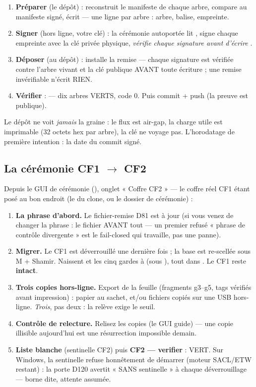 \begin{enumerate}
\item \textbf{Préparer} (le dépôt) :  reconstruit le
manifeste de chaque arbre, compare au manifeste signé, écrit  —
une ligne par arbre : arbre, balise, empreinte.
\item \textbf{Signer} (hors ligne, votre clé) : la cérémonie autoportée
 lit , signe chaque
empreinte avec la clé privée physique, \emph{vérifie chaque signature avant
d'écrire} .
\item \textbf{Déposer} (au dépôt) :  installe la remise —
chaque signature est vérifiée contre l'arbre vivant et la clé publique AVANT toute
écriture ; une remise invérifiable n'écrit RIEN.
\item \textbf{Vérifier} :  — dix arbres VERTS, code 0.
Puis commit + push (la preuve est publique).
\end{enumerate}

Le dépôt ne voit \emph{jamais} la graine : le flux est air-gap, la charge utile est
imprimable (32 octets hex par arbre), la clé ne voyage pas. L'horodatage de première
intention : la date du commit signé.

\subsection{La cérémonie CF1 $\to$ CF2}\label{sec:cercf2}

Depuis le GUI de cérémonie (), onglet « Coffre CF2 » — le
coffre réel CF1 étant posé au bon endroit (le  du clone, ou
le dossier de cérémonie) :

\begin{enumerate}
\item \textbf{La phrase d'abord.} Le fichier-remise D81 est à jour (si vous venez de
changer la phrase : le fichier AVANT tout — un premier  refusé « phrase
de contrôle divergente » est le fail-closed qui travaille, pas une panne).
\item \textbf{Migrer.} Le CF1 est déverrouillé une dernière fois ; la base est
re-scellée sous M + Shamir. Naissent  et les cinq gardes
 à  (sous ), tout dans . Le CF1
reste \textbf{intact}.
\item \textbf{Trois copies hors-ligne.} Export de la feuille (fragments g3--g5, tags
vérifiés avant impression) : papier au sachet, et/ou fichiers  copiés sur
une USB hors-ligne. \emph{Trois}, pas deux : la relève exige le seuil.
\item \textbf{Contrôle de relecture.} Relisez les copies (le GUI guide) — une copie
illisible aujourd'hui est une résurrection impossible demain.
\item \textbf{Liste blanche} (sentinelle CF2) puis \textbf{CF2 — verifier} : VERT.
Sur Windows, la sentinelle refuse honnêtement de démarrer (moteur SACL/ETW restant) :
la porte D120 avertit « SANS sentinelle » à chaque déverrouillage — borne dite,
attente assumée.
\end{enumerate}

